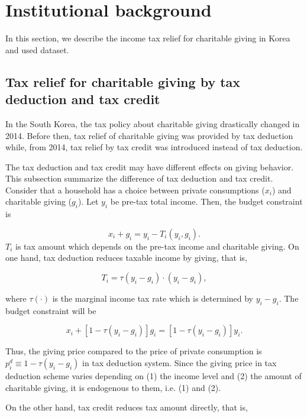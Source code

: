 \documentclass[ review  , 3p ]{elsarticle}
\begin{document}
  \hypertarget{institutional-background}{%
  \section{Institutional background}\label{institutional-background}}
  
  In this section, we describe the income tax relief for charitable giving in Korea and used dataset.
  
  \hypertarget{tax-relief-for-charitable-giving-by-tax-deduction-and-tax-credit}{%
  \subsection{Tax relief for charitable giving by tax deduction and tax credit}\label{tax-relief-for-charitable-giving-by-tax-deduction-and-tax-credit}}
  
  In the South Korea, the tax policy about charitable giving drastically changed in 2014. Before then, tax relief of charitable giving was provided by tax deduction while, from 2014, tax relief by tax credit was introduced instead of tax deduction.
  
  The tax deduction and tax credit may have different effects on giving behavior. This subsection summarize the difference of tax deduction and tax credit.
  Consider that a household has a choice between private consumptions (\(x_i\)) and charitable giving (\(g_i\)). Let \(y_i\) be pre-tax total income.
  Then, the budget constraint is
  
  \[
      x_i + g_i = y_i - T_i(y_i, g_i).
  \]
  \(T_i\) is tax amount which depends on the pre-tax income and charitable giving.
  On one hand, tax deduction reduces taxable income by giving, that is,
  
  \[
      T_i = \tau(y_i - g_i) \cdot (y_i - g_i),
  \]
  
  where \(\tau(\cdot)\) is the marginal income tax rate which is determined by \(y_i - g_i\). The budget constraint will be
  
  \[
      x_i + [1 - \tau(y_i - g_i)]g_i = [1 - \tau(y_i - g_i)] y_i.
  \]
  
  Thus, the giving price compared to the price of private consumption is \(p_i^{d} \equiv 1 - \tau(y_i - g_i)\) in tax deduction system. Since the giving price in tax deduction scheme varies depending on (1) the income level and (2) the amount of charitable giving, it is endogenous to them, i.e. (1) and (2).
  
  On the other hand, tax credit reduces tax amount directly, that is,
  
\end{document}
